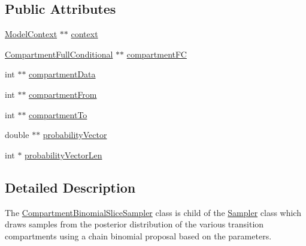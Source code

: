 \subsection*{Public Attributes}
\begin{DoxyCompactItemize}
\item 
\hyperlink{classSpatialSEIR_1_1ModelContext}{Model\-Context} $\ast$$\ast$ \hyperlink{classSpatialSEIR_1_1CompartmentBinomialSliceSampler_ad5631c8afe2fe4d0e8563b72fae517b0}{context}
\item 
\hyperlink{classSpatialSEIR_1_1CompartmentFullConditional}{Compartment\-Full\-Conditional} $\ast$$\ast$ \hyperlink{classSpatialSEIR_1_1CompartmentBinomialSliceSampler_abd146e1a97514494297f7863a61d381d}{compartment\-F\-C}
\item 
int $\ast$$\ast$ \hyperlink{classSpatialSEIR_1_1CompartmentBinomialSliceSampler_a6094cf1e5d3773db4d89186f19507c99}{compartment\-Data}
\item 
int $\ast$$\ast$ \hyperlink{classSpatialSEIR_1_1CompartmentBinomialSliceSampler_a7a8d30fa7485e4db0e68faa38aa7bc61}{compartment\-From}
\item 
int $\ast$$\ast$ \hyperlink{classSpatialSEIR_1_1CompartmentBinomialSliceSampler_a51e5687941d0911f0c5760af847b9c5d}{compartment\-To}
\item 
double $\ast$$\ast$ \hyperlink{classSpatialSEIR_1_1CompartmentBinomialSliceSampler_aff766a8c61753ae89e8b1a6ffea0d108}{probability\-Vector}
\item 
int $\ast$ \hyperlink{classSpatialSEIR_1_1CompartmentBinomialSliceSampler_aac982be0c3ae19b0a9960c0dbd1107ac}{probability\-Vector\-Len}
\end{DoxyCompactItemize}


\subsection{Detailed Description}
The \hyperlink{classSpatialSEIR_1_1CompartmentBinomialSliceSampler}{Compartment\-Binomial\-Slice\-Sampler} class is child of the \hyperlink{classSpatialSEIR_1_1Sampler}{Sampler} class which draws samples from the posterior distribution of the various transition compartments using a chain binomial proposal based on the parameters. 

